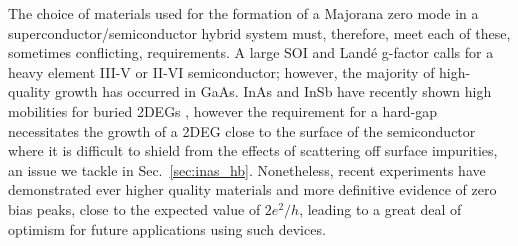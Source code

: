 The choice of materials used for the formation of a Majorana zero mode in a superconductor/semiconductor hybrid system must, therefore, meet each of these, sometimes
conflicting, requirements. A large SOI and Land\'e g-factor calls for a heavy element III-V or II-VI semiconductor; however, the majority of high-quality growth has occurred
in GaAs. InAs and InSb have recently shown high mobilities for buried 2DEGs \cite{PhysRevMaterials.2.104602,doi:10.1063/1.4993784}, however the
requirement for a hard-gap necessitates the growth of a 2DEG close to the surface of the semiconductor where it is difficult to
shield from the effects of scattering off surface impurities, an issue we tackle in Sec.~\ref{sec:inas_hb}. Nonetheless, recent experiments
have demonstrated ever higher quality materials and more definitive evidence of zero bias peaks, close
to the expected value of $2e^2/h$\cite{PhysRevLett.119.136803,nature26142}, leading to a great deal of optimism for future applications using such devices.
